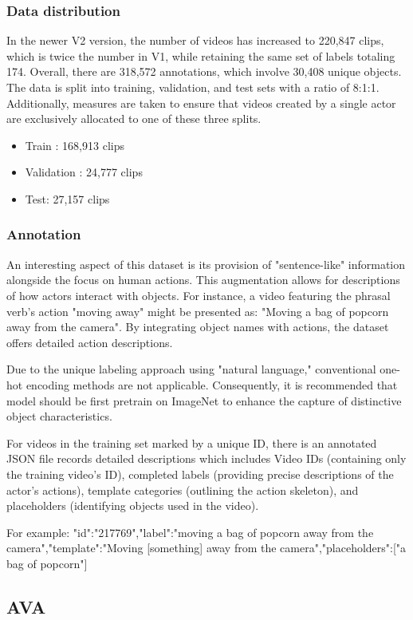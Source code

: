 \documentclass[10pt,onecolumn,letterpaper]{article}
\begin{document}
\subsubsection{Data distribution}
In the newer V2 version, the number of videos has increased to 220,847 clips, which is twice the number in V1, while retaining the same set of labels totaling 174. Overall, there are 318,572 annotations, which involve 30,408 unique objects. The data is split into training, validation, and test sets with a ratio of 8:1:1. Additionally, measures are taken to ensure that videos created by a single actor are exclusively allocated to one of these three splits. 
\begin{itemize}
	\item Train : 168,913 clips
	\item Validation : 24,777 clips
	\item Test: 27,157 clips
\end{itemize}
\subsubsection{Annotation}

An interesting aspect of this dataset is its provision of "sentence-like" information alongside the focus on human actions. This augmentation allows for descriptions of how actors interact with objects. For instance, a video featuring the phrasal verb's action "moving away" might be presented as: "Moving a bag of popcorn away from the camera". By integrating object names with actions, the dataset offers detailed action descriptions. 

Due to the unique labeling approach using "natural language," conventional one-hot encoding methods are not applicable. Consequently, it is recommended that model should be first pretrain on ImageNet to enhance the capture of distinctive object characteristics.

For videos in the training set marked by a unique ID, there is an annotated JSON file records detailed descriptions which includes Video IDs (containing only the training video's ID), completed labels (providing precise descriptions of the actor's actions), template categories (outlining the action skeleton), and placeholders (identifying objects used in the video).

For example: {"id":"217769","label":"moving a bag of popcorn away from the camera","template":"Moving [something] away from the camera","placeholders":["a bag of popcorn"]}
\subsection{AVA}
\end{document}
